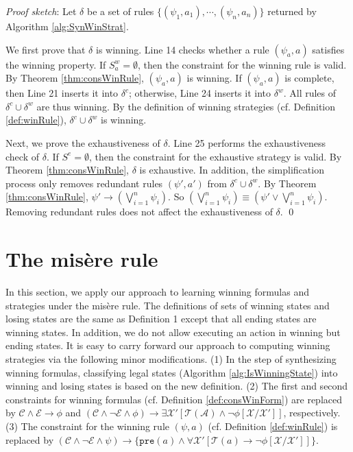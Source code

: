 \documentclass[review]{elsarticle}
\newcommand{\set}[1]{\{ #1 \}}
\newcommand{\statevar}{\mathcal{X}}
\newcommand{\act}{\mathcal{A}}
\newcommand{\trans}{\mathcal{T}}
\newcommand{\constraint}{\mathcal{C}}
\newcommand{\estate}{\mathcal{E}}
\newcommand{\pre}{\mathtt{pre}}
\newenvironment{proofsketch}{\textit{Proof sketch}:}{\qed}
\begin{document}
\begin{proofsketch}
	Let $\delta$ be a set of rules $\set{(\psi_1, a_1), \cdots, (\psi_n, a_n)}$ returned by Algorithm \ref{alg:SynWinStrat}.
	
	We first prove that $\delta$ is winning.
	Line 14 checks whether a rule $(\psi_a, a)$ satisfies the winning property.
	If $S^w_a = \emptyset$,	then the constraint for the winning rule is valid.
	By Theorem \ref{thm:consWinRule}, $(\psi_a, a)$ is winning.
	If $(\psi_a, a)$ is complete, then Line 21 inserts it into $\delta^c$; otherwise, Line 24 inserts it into $\delta^w$.
	All rules of $\delta^c \cup \delta^w$ are thus winning.
	By the definition of winning strategies (cf. Definition \ref{def:winRule}), $\delta^c \cup \delta^w$ is winning.
	
	Next, we prove the exhaustiveness of $\delta$.
	Line 25 performs the exhaustiveness check of $\delta$. 
	If $S^e = \emptyset$, then the constraint for the exhaustive strategy is valid.
	By Theorem \ref{thm:consWinRule}, $\delta$ is exhaustive.
	In addition, the simplification process only removes redundant rules $(\psi', a')$ from $\delta^c \cup \delta^w$.
	By Theorem \ref{thm:consWinRule}, $\psi' \rightarrow (\bigvee_{i = 1}^n \psi_i)$.
	So $(\bigvee_{i = 1}^n \psi_i) \equiv (\psi' \lor \bigvee_{i = 1}^n \psi_i)$.
	Removing redundant rules does not affect the exhaustiveness of $\delta$.
\end{proofsketch}


\section{The mis\`{e}re rule} \label{sec:misere}
	In this section, we apply our approach to learning winning formulas and strategies under the mis\`{e}re rule.
	The definitions of sets of winning states and losing states are the same as Definition 1 except that all ending states are winning states.
	In addition, we do not allow executing an action in winning but ending states.
	It is easy to carry forward our approach to computing winning strategies via the following minor modifications.
	(1) In the step of synthesizing winning formulas, classifying legal states (Algorithm \ref{alg:IsWinningState}) into winning and losing states is based on the new definition.
	(2) The first and second constraints for winning formulas (cf. Definition \ref{def:consWinForm}) are replaced by $\constraint \land \estate \rightarrow \phi$ and $(\constraint \land \neg \estate \land \phi) \rightarrow \exists \statevar' [\trans(\act) \land \neg \phi[\statevar/\statevar']]$, respectively. 
	(3) The constraint for the winning rule $(\psi, a)$ (cf. Definition \ref{def:winRule}) is replaced by $(\constraint \land \neg \estate \land \psi) \rightarrow \{\pre(a)  \land \forall \statevar' [\trans(a) \rightarrow \neg \phi[\statevar/\statevar']]\}$.
	
\end{document}
